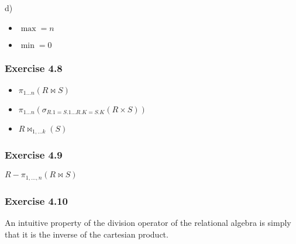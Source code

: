 \documentclass[../../main.tex]{subfiles}
\begin{document}
d)

\begin{itemize}
  \item $\max = n$
  \item $\min = 0$
\end{itemize}

\subsubsection*{Exercise 4.8}

\begin{itemize}
  \item $\pi_{1\dots n}(R \bowtie S)$
  \item $\pi_{1\dots n}(\sigma_{R.1=S.1 
        \dots R.K=S.K}(R \times S))$
  \item $R \bowtie_{1, \dots k}(S)$
\end{itemize}

\subsubsection*{Exercise 4.9}

$R - \pi_{1,\dots,n}(R \bowtie S)$

\subsubsection*{Exercise 4.10}

An intuitive property of the division operator of
the relational algebra is simply that it is the inverse
of the cartesian product.
  
\end{document}
